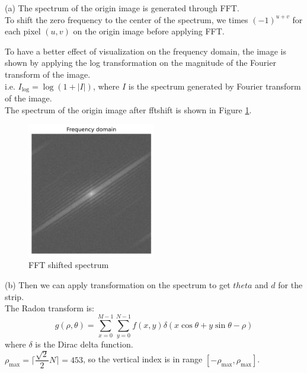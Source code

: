 (a) The spectrum of the origin image is generated through FFT.\\
To shift the zero frequency to the center of the spectrum, we times $(-1)^{u+v}$ for each pixel $(u,v)$ on the origin image before applying FFT.

To have a better effect of visualization on the frequency domain, the image is shown by applying the log transformation on the magnitude of the Fourier transform of the image.\\
i.e. $I_{\text{log}}=\log(1+|I|)$, where $I$ is the spectrum generated by Fourier transform of the image.\\
The spectrum of the origin image after fftshift is shown in Figure \ref{fig:p4a}.\\
\begin{figure}[htbp]
    \centering
	\includegraphics[width=0.5\textwidth]{../images/p4/p4a.png}
    \caption{FFT shifted spectrum}
    \label{fig:p4a}
\end{figure}

(b) Then we can apply transformation on the spectrum to get $theta$ and $d$ for the strip.\\
The Radon transform is:
$$g(\rho, \theta)=\sum_{x=0}^{M-1}\sum_{y=0}^{N-1}f(x,y)\delta(x\cos\theta+y\sin\theta-\rho)$$
where $\delta$ is the Dirac delta function.\\
$\rho_{\text{max}}=\lceil\dfrac{\sqrt{2}}{2}N\rceil=453$, so the vertical index is in range $[-\rho_{\text{max}},\rho_{\text{max}}]$.

